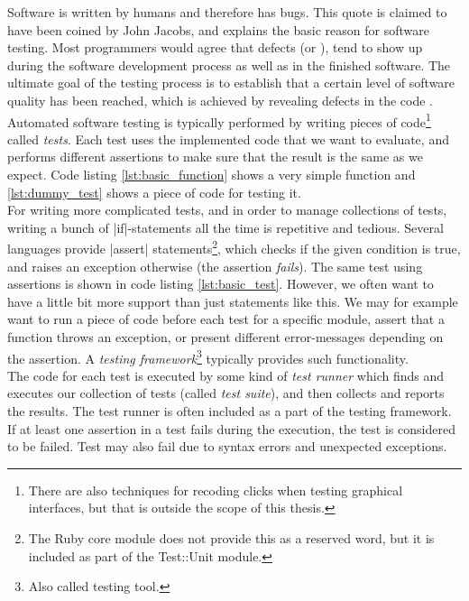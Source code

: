 \MakeShortVerb{\|}

Software is written by humans and therefore has bugs. This quote is
claimed to have been coined by John Jacobs\cite{web:quote_jacobs}, and
explains the basic reason for software testing. Most programmers would
agree that defects (or ), tend to show up
during the software development process as well as in the finished
software. The ultimate goal of the testing process is to establish that
a certain level of software quality has been reached, which is achieved
by revealing defects in the code \cite{book:adp}.\\

Automated software testing is typically performed by writing pieces of
code\footnote{There are also techniques for recoding clicks when testing
graphical interfaces, but that is outside the scope of this thesis.}
called \emph{tests}. Each test uses the implemented code that we want to
evaluate, and performs different assertions to make sure that the result
is the same as we expect. Code listing \ref{lst:basic_function} shows a
very simple function and \ref{lst:dummy_test} shows a piece of code for
testing it.\cite{wiki:test_automation}\\

For writing more complicated tests, and in order to manage collections
of tests, writing a bunch of |if|-statements all the time is repetitive
and tedious. Several languages provide |assert| statements\footnote{The
Ruby core module does not provide this as a reserved word, but it is
included as part of the Test::Unit module.}, which checks if the given
condition is true, and raises an exception otherwise (the assertion
\emph{fails}). The same test using assertions is shown in code listing
\ref{lst:basic_test}. However, we often want to have a little bit more
support than just statements like this. We may for example want to run a
piece of code before each test for a specific module, assert that a
function throws an exception, or present different error-messages
depending on the assertion. A \emph{testing framework}\footnote{Also
called testing tool.} typically provides such
functionality.\cite{wiki:test_automation}\\

The code for each test is executed by some kind of \emph{test runner}
which finds and executes our collection of tests (called \emph{test
suite}), and then collects and reports the results. The test runner is
often included as a part of the testing framework. If at least one
assertion in a test fails during the execution, the test is considered
to be failed. Test may also fail due to syntax errors and unexpected
exceptions.\\

